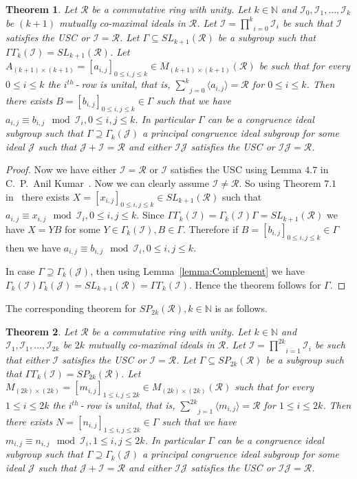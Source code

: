 \documentclass[12pt]{amsart}
\newcommand{\mbb}{\mathbb}
\newcommand{\mcl}{\mathcal}
\newcommand{\us}{\underset}
\newcommand{\os}{\overset}
\newcommand{\I}{\mcl I}
\newcommand{\N}{\mbb N}
\newcommand{\R}{\mcl R}
\theoremstyle{plain}
\newtheorem{theorem}{Theorem}[section]
\theoremstyle{definition}
\theoremstyle{remark}
\numberwithin{equation}{section}
\begin{document}
\begin{theorem}
	\label{theorem:GenSurjMainGenIdeals}
	Let $\R$ be a commutative ring with unity. 
	Let $k\in \mbb{N}$ and $\mcl{I}_0,\mcl{I}_1,\ldots,\mcl{I}_k$ be $(k+1)$ mutually co-maximal ideals in $\R$. Let $\mcl{I}=\us{i=0}{\os{k}{\prod}}\mcl{I}_i$ be such that $\I$ satisfies the USC or $\I=\R$. Let $\Gamma \subseteq SL_{k+1}(\R)$ be a  subgroup such that $\Gamma\Gamma_k(\mcl{\I})=SL_{k+1}(\R)$.
	Let $A_{(k+1)\times (k+1)}=[a_{i,j}]_{0\leq i,j \leq k}\in M_{(k+1)\times (k+1)}(\R)$ be such that for every $0\leq i\leq k$ the $i^{th}\operatorname{-}$row is unital, that is, $\us{j=0}{\os{k}{\sum}} \langle a_{i,j}\rangle =\R$
	for $0\leq i\leq k$. Then there exists $B=[b_{i,j}]_{0\leq i,j \leq k}\in \Gamma$ such that we have 
	$a_{i,j}\equiv b_{i,j}\mod \mcl{I}_i,0\leq i,j\leq k$. In particular $\Gamma$ can be a congruence ideal subgroup such that $\Gamma\supseteq \Gamma_k(\mcl{J})$ a principal congruence ideal subgroup for some ideal $\mcl{J}$ such that $\mcl{J}+\mcl{I}=\R$ and either $\I\mcl{J}$ satisfies the USC or $\I\mcl{J}=\R$.
\end{theorem}
\begin{proof}
Now we have either $\I=\R$ or $\I$ satisfies the USC using Lemma $4.7$ in C.~P.~Anil Kumar~\cite{CPAKII}. Now we can clearly assume $\I\neq \R$. So using Theorem $7.1$ in~\cite{CPAKII} there exists $X=[x_{i,j}]_{0\leq i,j \leq k}\in SL_{k+1}(\R)$ such that $a_{i,j}\equiv x_{i,j}\mod \mcl{I}_i,0\leq i,j\leq k$. Since $\Gamma\Gamma_k(\I)=\Gamma_k(\I)\Gamma=SL_{k+1}(\R)$ we have $X=YB$ for some $Y\in\Gamma_k(\I),B\in \Gamma$.  Therefore if $B=[b_{i,j}]_{0\leq i,j \leq k}\in \Gamma$ then we have 
$a_{i,j}\equiv b_{i,j}\mod \mcl{I}_i,0\leq i,j\leq k$.
 
In case $\Gamma \supseteq \Gamma_k(\mcl{J})$, then using Lemma~\ref{lemma:Complement} we have $\Gamma_k(\I)\Gamma_k(\mcl{J})=SL_{k+1}(\R)=\Gamma\Gamma_k(\I)$.  Hence the theorem follows for $\Gamma$.
\end{proof}
The corresponding theorem for $SP_{2k}(\R),k\in \N$ is as follows.
\begin{theorem}
	\label{theorem:GenSurjMain}
	Let $\R$ be a commutative ring with unity. 
	Let $k\in \mbb{N}$ and $\mcl{I}_1,\mcl{I}_1,\ldots,\mcl{I}_{2k}$ be $2k$ mutually co-maximal ideals in $\R$. Let $\mcl{I}=\us{i=1}{\os{2k}{\prod}}\mcl{I}_i$ be such that either $\I$ satisfies the USC or $\I=\R$. Let $\Gamma \subseteq SP_{2k}(\R)$ be a  subgroup such that $\Gamma\Gamma_k(\mcl{\I})=SP_{2k}(\R)$.
	Let $M_{(2k)\times (2k)}=[m_{i,j}]_{1\leq i,j \leq 2k}\in M_{(2k)\times (2k)}(\R)$ such that for every $1\leq i\leq 2k$ the $i^{th}\operatorname{-}$row is unital, that is, $\us{j=1}{\os{2k}{\sum}} \langle m_{i,j}\rangle =\R$
	for $1\leq i\leq 2k$. Then there exists $N=[n_{i,j}]_{1\leq i,j \leq 2k}\in \Gamma$ such that we have 
	$m_{i,j}\equiv n_{i,j}\mod \mcl{I}_i,1\leq i,j\leq 2k$. In particular $\Gamma$ can be a congruence ideal subgroup such that $\Gamma\supseteq \Gamma_k(\mcl{J})$ a principal congruence ideal subgroup for some ideal $\mcl{J}$ such that $\mcl{J}+\mcl{I}=\R$ and either $\I\mcl{J}$ satisfies the USC or $\I\mcl{J}=\R$.
\end{theorem}
\end{document}
